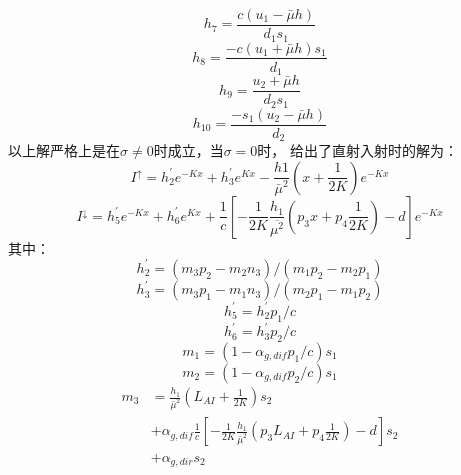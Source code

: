 \begin{equation}
h_{7}=\frac{c\left(u_{1}-\bar{\mu} h\right)}{d_{1} s_{1}}
\end{equation}
\begin{equation}
h_{8}=\frac{-c\left(u_{1}+\bar{\mu} h\right) s_{1}}{d_{1}}
\end{equation}
\begin{equation}
h_{9}=\frac{u_{2}+\bar{\mu} h}{d_{2} s_{1}}
\end{equation}
\begin{equation}
h_{10}=\frac{-s_{1}\left(u_{2}-\bar{\mu} h\right)}{d_{2}}
\end{equation}
以上解严格上是在$\sigma \neq 0$时成立，当$\sigma = 0$时，\citet{dai2004two} 给出了直射入射时的解为：
\begin{equation}
I^{\uparrow}=h_{2}^{\prime} e^{-K x}+h_{3}^{\prime} e^{K x}-\frac{h 1}{\bar{\mu}^{2}}\left(x+\frac{1}{2 K}\right) e^{-K x}
\end{equation}
\begin{equation}
I^{\downarrow}=h_{5}^{\prime} e^{-K x}+h_{6}^{\prime} e^{K x}+\frac{1}{c}\left[-\frac{1}{2 K}
 \frac{h_{1}}{\overline{\mu^{2}}}\left(p_{3} x+p_{4} \frac{1}{2 K}\right)-d\right] e^{-K x}
\end{equation}
其中：
\begin{equation}
h_{2}^{\prime}=\left(m_{3} p_{2}-m_{2} n_{3}\right) /\left(m_{1} p_{2}-m_{2} p_{1}\right)
\end{equation}
\begin{equation}
h_{3}^{\prime}=\left(m_{3} p_{1}-m_{1} n_{3}\right) /\left(m_{2} p_{1}-m_{1} p_{2}\right)
\end{equation}
\begin{equation}
h_{5}^{\prime}=h_{2}^{\prime} p_{1} / c
\end{equation}
\begin{equation}
h_{6}^{\prime}=h_{3}^{\prime} p_{2} / c
\end{equation}
\begin{equation}
m_{1}=\left(1-\alpha_{g, dif} p_{1} / c\right) s_{1}
\end{equation}
\begin{equation}
m_{2}=\left(1-\alpha_{g, dif } p_{2} / c\right) s_{1}
\end{equation}
\begin{equation}
\begin{aligned} 
m_{3} &=\frac{h_{1}}{\bar{\mu}^{2}}\left(L_{AI}+\frac{1}{2 K}\right) s_{2} \\ 
           &+\alpha_{g, dif}\frac{1}{c}\left[-\frac{1}{2 K} \frac{h_{1}}{\bar{\mu}^{2}}\left(p_{3} L_{AI}+p_{4} \frac{1}{2 K}\right)-d\right] s_{2} \\ 
           &+\alpha_{g, dir} s_{2} 
 \end{aligned}
\end{equation}
